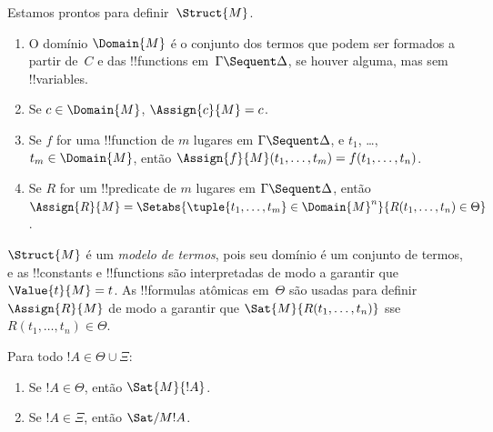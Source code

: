 \documentclass[../../../include/open-logic-section]{subfiles}
\begin{document}
Estamos prontos para definir~$\Struct{M}$.
\begin{enumerate}
\item O domínio $\Domain{M}$ é o conjunto dos termos que podem ser
formados a partir de~$C$ e das !!{function}s em~$\Gamma \Sequent
\Delta$, se houver alguma, mas sem !!{variable}s.
\item Se $c \in \Domain{M}$, $\Assign{c}{M} = c$.
\item Se $f$ for uma !!{function} de $m$ lugares em $\Gamma \Sequent
\Delta$, e $t_1$, \dots, $t_m \in \Domain{M}$, então
$\Assign{f}{M}(t_1, \dots, t_m) = f(t_1, \dots, t_n)$.
\item Se $R$ for um !!{predicate} de $m$ lugares em $\Gamma \Sequent
\Delta$, então $\Assign{R}{M} = \Setabs{\tuple{t_1, \dots, t_m} \in
\Domain{M}^n}{R(t_1, \dots, t_n) \in \Theta}$.
\end{enumerate}
$\Struct{M}$ é um \emph{modelo de termos}, pois seu domínio é um
conjunto de termos, e as !!{constant}s e !!{function}s são interpretadas
de modo a garantir que $\Value{t}{M} = t$. As !!{formula}s atômicas
em~$\Theta$ são usadas para definir $\Assign{R}{M}$ de modo a garantir
que $\Sat{M}{R(t_1, \dots, t_n)}$ sse $R(t_1, \dots, t_n) \in
\Theta$.

\begin{lem}
Para todo $!A \in \Theta \cup \Xi$:
\begin{enumerate}
  \item Se $!A \in \Theta$, então $\Sat{M}{!A}$.
  \item Se $!A \in \Xi$, então $\Sat/{M}{!A}$.
\end{enumerate}
\end{lem}
\end{document}

